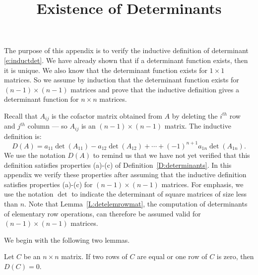 \documentclass{ximera}
\title{Existence of Determinants}
\begin{document}
\begin{abstract}
\end{abstract}
\maketitle


\label{A:det}

\newcommand{\Matrix}[1]{\ensuremath{\left[\begin{array}%
{ccccccccccccccccc} #1 \end{array}\right]}}


The purpose of this appendix is to verify the inductive
definition of determinant \eqref{e:inductdet}. We have already
shown that if a determinant function exists, then it is unique.
We also know that the determinant function exists for $1\times
1$ matrices. So we assume by induction that the determinant function
exists for $(n-1)\times(n-1)$ matrices and prove that the
inductive definition gives a determinant function for $n\times
n$ matrices.  

Recall that $A_{ij}$ is the cofactor matrix obtained from $A$ by
deleting the $i^{th}$ row and $j^{th}$ column --- so $A_{ij}$ is
an $(n-1)\times(n-1)$ matrix.  The inductive definition is:
  
\[
D(A) = a_{11}\det(A_{11})-a_{12}\det(A_{12})+\cdots 
+(-1)^{n+1}a_{1n}\det(A_{1n}).
\]
We use the notation $D(A)$ to remind us that we have not yet
verified that this definition satisfies properties (a)-(c) of
Definition~\ref{D:determinants}.  In this appendix we verify these
properties after assuming that the inductive definition
satisfies properties (a)-(c) for $(n-1)\times (n-1)$ matrices.
For emphasis, we use the notation $\det$ to indicate the
determinant of square matrices of size less than $n$.  Note 
that Lemma~\ref{L:detelemrowmat}, the computation of 
determinants of elementary row operations, can therefore 
be assumed valid for $(n-1)\times (n-1)$ matrices.

We begin with the following two lemmas.

\begin{lemma} \label{L:two_equal}
Let $C$ be an $n\times n$ matrix.  If two rows of  $C$ are equal 
or one row of $C$ is zero, then $D(C)=0$. 
\end{lemma}
\end{document}
